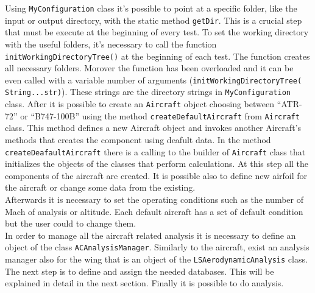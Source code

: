 Using  \texttt{MyConfiguration} class it's possible to point at a specific folder, like the input or output directory, with the static method  \texttt{getDir}. This is a crucial step that must be execute at the beginning of every test.
To set the working directory with the useful folders, it's necessary to call the function \texttt{initWorkingDirectoryTree()} at the beginning of each test. The function creates all necessary folders. Morover the function has been overloaded and it can be even called with a variable number of arguments (\texttt{initWorkingDirectoryTree( String...str)}). These strings are the directory strings in \texttt{MyConfiguration} class.
After it is possible to create an \texttt{Aircraft} object choosing between ``ATR-72'' or ``B747-100B'' using the method \texttt{createDefaultAircraft} from \texttt{Aircraft} class. This method defines a new Aircraft object and invokes another Aircraft's methods that creates the component using deafult data. In the method \texttt{createDeafaultAircraft} there is a calling to the builder of \texttt{Aircraft} class that initializes the objects of the classes that perform calculations. At this step all the components of the aircraft are created. It is possible also to define new airfoil for the aircraft or change some data from the existing. \\
Afterwards it is necessary to set the operating conditions such as the number of Mach of analysis or altitude. Each default aircraft has a set of default condition but the user could to change them.\\
In order to manage all the aircraft related analysis it is necessary to define an object of the class  \texttt{ACAnalysisManager}. Similarly to the aircraft,  exist an analysis manager also for the wing that is an object of the  \texttt{LSAerodynamicAnalysis} class. \\
The next step is to define and assign the needed databases. This will be explained in detail in the next section. Finally it is possible to do analysis.

